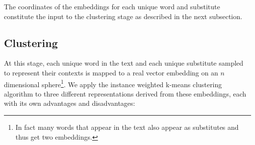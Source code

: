 The coordinates of the embeddings for each unique word and substitute
constitute the input to the clustering stage as described in the next
subsection.


\subsection{Clustering}
\label{sec:clustering}

At this stage, each unique word in the text and each unique substitute
sampled to represent their contexts is mapped to a real vector
embedding on an $n$ dimensional sphere\footnote{In fact many words
  that appear in the text also appear as substitutes and thus get two
  embeddings.}.  We apply the instance weighted k-means clustering
algorithm to three different representations derived from these
embeddings, each with its own advantages and disadvantages:

